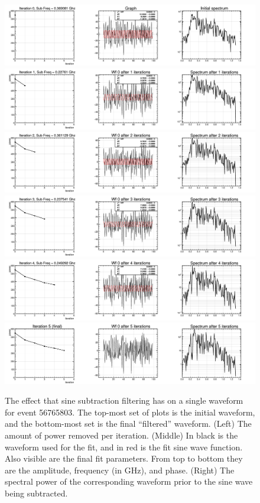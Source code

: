 \begin{figure}
	\centering
	\includegraphics[height=0.15\textheight]{figures/sineSubtract_0}		
	\includegraphics[height=0.15\textheight]{figures/sineSubtract_1}
	\includegraphics[height=0.15\textheight]{figures/sineSubtract_2}
	\includegraphics[height=0.15\textheight]{figures/sineSubtract_3}
	\includegraphics[height=0.15\textheight]{figures/sineSubtract_4}
	\includegraphics[height=0.15\textheight]{figures/sineSubtract_5}
	\caption{The effect that sine subtraction filtering has on a single waveform for event 56765803.  The top-most set of plots is the initial waveform, and the bottom-most set is the final ``filtered'' waveform. (Left) The amount of power removed per iteration.  (Middle) In black is the waveform used for the fit, and in red is the fit sine wave function.  Also visible are the final fit parameters.  From top to bottom they are the amplitude, frequency (in GHz), and phase.  (Right) The spectral power of the corresponding waveform prior to the sine wave being subtracted.} 
	\label{fig:SineSubtractExample}
\end{figure}

